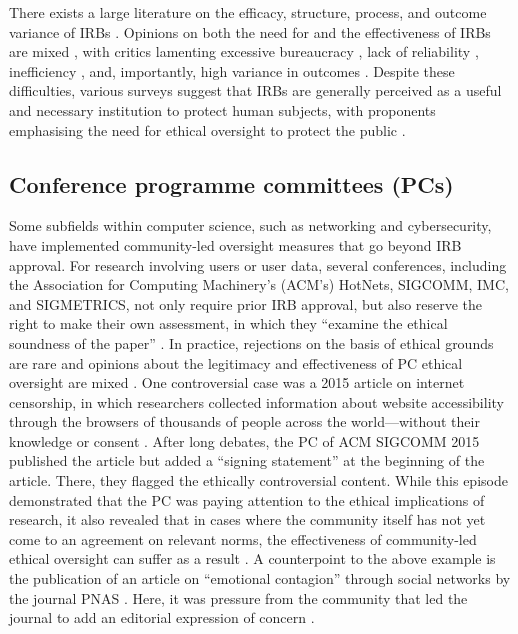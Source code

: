 \documentclass[11pt,english]{article}
\begin{document}
There exists a large literature on the efficacy, structure, process, and outcome variance of IRBs \citep{abbott_systematic_2011}. Opinions on both the need for and the effectiveness of IRBs are mixed \citep{hyman_institutional_2007}, with critics lamenting excessive bureaucracy \citep{zywicki_institutional_2007}, lack of reliability \citep{whitney_principal_2008}, inefficiency \citep{chadwick_institutional_2000,fost_dysregulation_2007}, and, importantly, high variance in outcomes \citep{dziak_variations_2005,larson_survey_2004,shah_how_2004,mcwilliams_problematic_2003,goldman_inconsistency_1982}. Despite these difficulties, various surveys suggest that IRBs are generally perceived as a useful and necessary institution to protect human subjects, with proponents emphasising the need for ethical oversight to protect the public \citep{reeser_investigating_2008,stryjewski_impact_2015,keith-spiegel_what_2006,saleem_institutional_2011,chadwick_institutional_2000}. 

\subsection{Conference programme committees (PCs)}

Some subfields within computer science, such as networking and cybersecurity, have implemented community-led oversight measures that go beyond IRB approval. For research involving users or user data, several conferences, including the Association for Computing Machinery's (ACM's) HotNets, SIGCOMM, IMC, and SIGMETRICS, not only require prior IRB approval, but also reserve the right to make their own assessment, in which they ``examine the ethical soundness of the paper'' \citep{acm_sigmetrics_call_2020}. In practice, rejections on the basis of ethical grounds are rare and opinions about the legitimacy and effectiveness of PC ethical oversight are mixed \citep{narayanan_no_2015,kenneally_cyber-security_2014}. One controversial case was a 2015 article on internet censorship, in which researchers collected information about website accessibility through the browsers of thousands of people across the world---without their knowledge or consent \citep{burnett_encore_2015}. After long debates, the PC of ACM SIGCOMM 2015 published the article but added a ``signing statement'' at the beginning of the article. There, they flagged the ethically controversial content. While this episode demonstrated that the PC was paying attention to the ethical implications of research, it also revealed that in cases where the community itself has not yet come to an agreement on relevant norms, the effectiveness of community-led ethical oversight can suffer as a result \citep{kenneally_cyber-security_2014}. A counterpoint to the above example is the publication of an article on ``emotional contagion'' through social networks by the journal PNAS \citep{kramer_experimental_2014}. Here, it was pressure from the community that led the journal to add an editorial expression of concern \citep{pnas_editorial_2014}.
\end{document}
